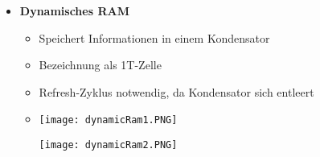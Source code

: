 \begin{itemize}
\pagebreak

        \item \textbf{Dynamisches RAM}
            \begin{itemize}
                \item Speichert Informationen in einem Kondensator
                \item Bezeichnung als 1T-Zelle
                \item Refresh-Zyklus notwendig, da Kondensator sich entleert
                \item[]
                    \begin{minipage}{0.45\textwidth}
                        \texttt{[image: dynamicRam1.PNG]}
                    \end{minipage}
                    \begin{minipage}{0.45\textwidth}
                        \texttt{[image: dynamicRam2.PNG]}
                    \end{minipage}
            \end{itemize}
    \end{itemize}

